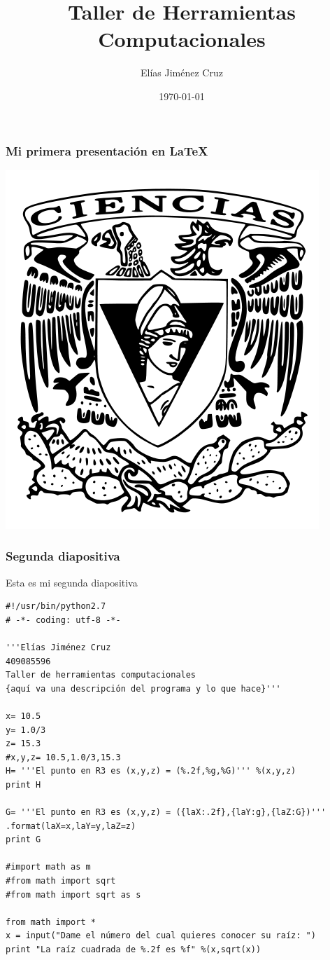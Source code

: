 \documentclass{beamer}
\title{Taller de Herramientas Computacionales}
\author{Elías Jiménez Cruz}
\date{\today}
\begin{document}
\maketitle
\begin{frame}
\transblindshorizontal
\frametitle{Mi primera presentación en LaTeX}
\begin{center}
\includegraphics[scale=0.40]{EscudoFC.png}
\end{center}
\end{frame}
\begin{frame}
\frametitle{Segunda diapositiva}
Esta es mi segunda diapositiva
\end{frame}
\begin{frame}[fragile]
\begin{verbatim}
#!/usr/bin/python2.7
# -*- coding: utf-8 -*-

'''Elías Jiménez Cruz
409085596
Taller de herramientas computacionales
{aquí va una descripción del programa y lo que hace}'''

x= 10.5
y= 1.0/3
z= 15.3
#x,y,z= 10.5,1.0/3,15.3
H= '''El punto en R3 es (x,y,z) = (%.2f,%g,%G)''' %(x,y,z)
print H

G= '''El punto en R3 es (x,y,z) = ({laX:.2f},{laY:g},{laZ:G})''' .format(laX=x,laY=y,laZ=z)
print G

#import math as m
#from math import sqrt
#from math import sqrt as s

from math import *
x = input("Dame el número del cual quieres conocer su raíz: ")
print "La raíz cuadrada de %.2f es %f" %(x,sqrt(x))
\end{verbatim}
\end{frame}
\end{document}
